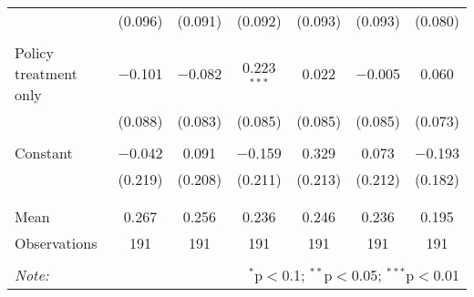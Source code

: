 \begin{tabular}{@{\extracolsep{5pt}}lcccccc}
  & (0.096) & (0.091) & (0.092) & (0.093) & (0.093) & (0.080) \\ 
  & & & & & & \\ 
 Policy treatment only & $-$0.101 & $-$0.082 & 0.223$^{***}$ & 0.022 & $-$0.005 & 0.060 \\ 
  & (0.088) & (0.083) & (0.085) & (0.085) & (0.085) & (0.073) \\ 
  & & & & & & \\ 
 Constant & $-$0.042 & 0.091 & $-$0.159 & 0.329 & 0.073 & $-$0.193 \\ 
  & (0.219) & (0.208) & (0.211) & (0.213) & (0.212) & (0.182) \\ 
  & & & & & & \\ 
\hline \\[-1.8ex] 
Mean & 0.267 & 0.256 & 0.236 & 0.246 & 0.236 & 0.195 \\ 
Observations & 191 & 191 & 191 & 191 & 191 & 191 \\ 
\hline 
\hline \\[-1.8ex] 
\textit{Note:}  & \multicolumn{6}{r}{$^{*}$p$<$0.1; $^{**}$p$<$0.05; $^{***}$p$<$0.01} \\ 
\end{tabular} 
